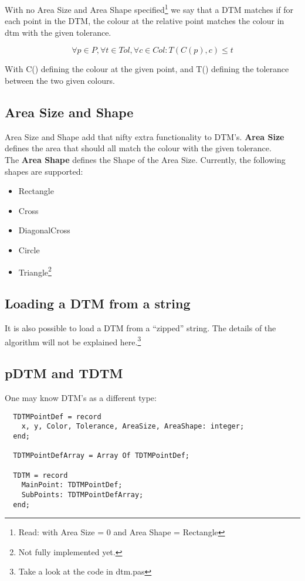 \documentclass[a4paper, 10pt]{report} %
\begin{document}
With no Area Size and Area Shape specified\footnote{Read: with Area
Size = 0 and Area Shape = Rectangle} we say that a DTM matches if for each
point in the DTM, the colour at the relative point matches the colour in dtm
with the given tolerance.

$$ \forall p \in P, \forall t \in Tol, \forall c \in Col : T(C(p), c) \leq t $$

With C() defining the colour at the given point, and T() defining the tolerance
between the two given colours.

\subsection{Area Size and Shape}

Area Size and Shape add that nifty extra functionality to DTM's.
\textbf{Area Size} defines the area that should all match the colour
with the given tolerance. \\

The \textbf{Area Shape} defines the Shape of the Area Size.
Currently, the following shapes are supported:
\begin{itemize}
	\item Rectangle
	\item Cross
	\item DiagonalCross
	\item Circle
	\item Triangle\footnote{Not fully implemented yet.}
\end{itemize}

\subsection{Loading a DTM from a string}

It is also possible to load a DTM from a ``zipped'' string.
The details of the algorithm will not be explained here.\footnote{Take
a look at the code in dtm.pas}

\subsection{pDTM and TDTM}

One may know DTM's as a different type:

\begin{verbatim}
  TDTMPointDef = record
    x, y, Color, Tolerance, AreaSize, AreaShape: integer;
  end;

  TDTMPointDefArray = Array Of TDTMPointDef;

  TDTM = record
    MainPoint: TDTMPointDef;
    SubPoints: TDTMPointDefArray;
  end;    
\end{verbatim}
\end{document}
